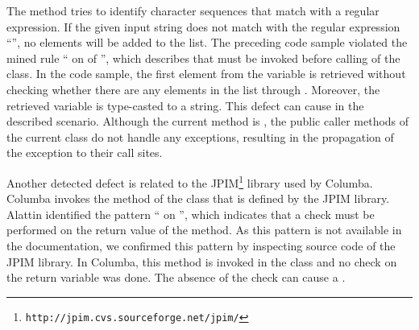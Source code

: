 {The method  tries to identify character sequences
that match with a regular expression. If the given input string does not match with the regular expression
``'', no elements will be added to the  list.
The preceding code sample violated the mined rule `` on  of
  '',
which describes that  must be invoked before 
calling  of the  class.  In the code sample,
the first element from the  variable is retrieved without checking whether there
are any elements in the list through . Moreover, 
the retrieved variable is type-casted to a string. This defect
can cause  in the described scenario. Although the current method
is , the public caller methods of the current class do not handle any
exceptions, resulting in the propagation of the exception to their call sites. 

Another detected defect is related to the JPIM\footnote{\texttt{http://jpim.cvs.sourceforge.net/jpim/}} 
library used by Columba. Columba invokes the method 
of the class  that is defined by the JPIM library. 
Alattin identified the pattern `` on  
'', which indicates that a  check must be 
performed on the return value of the  method. 
As this pattern is not available in the documentation, we confirmed this pattern by inspecting 
source code of the JPIM library.
In Columba, this method is invoked in the class 
and no  check on the return variable was done. The absence of the  check 
can cause a .

}

